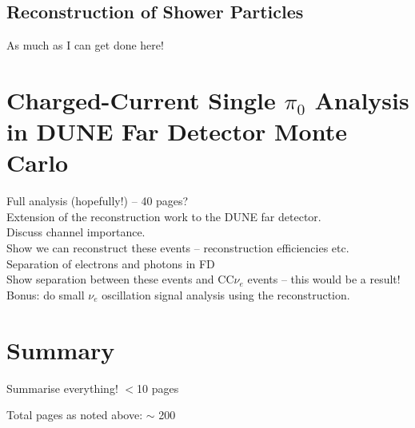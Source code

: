 \documentclass[a4paper,12pt]{report}
\begin{document}
\subsection{Reconstruction of Shower Particles}
As much as I can get done here!

\section{Charged-Current Single $\pi_0$ Analysis in DUNE Far Detector Monte Carlo}
Full analysis (hopefully!) -- 40 pages?\\
Extension of the reconstruction work to the DUNE far detector.\\
Discuss channel importance.\\
Show we can reconstruct these events -- reconstruction efficiencies etc.\\
Separation of electrons and photons in FD\\
Show separation between these events and CC$\nu_e$ events -- this would be a result!\\
Bonus: do small $\nu_e$ oscillation signal analysis using the reconstruction.

\section{Summary}
Summarise everything! $<$10 pages

Total pages as noted above: $\sim$ 200
\end{document}
